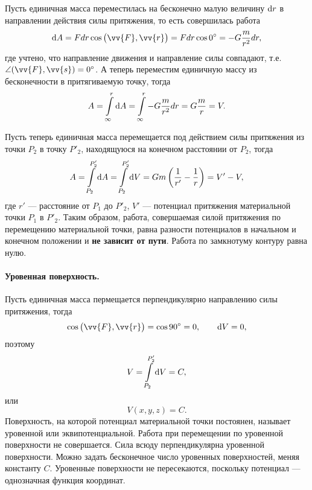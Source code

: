 \documentclass[11pt, a4paper]{article}
\theoremstyle{plain}
\theoremstyle{definition}
\theoremstyle{remark}
\begin{document}
Пусть единичная масса переместилась на бесконечно малую величину $\dif r$ в направлении действия силы
притяжения, то есть совершилась работа
\begin{equation*}
    \dif A = F dr \cos{\left( \vv{F}, \vv{r} \right)} =
    F dr \cos{0^\circ} = -G\dfrac{m}{r^2}dr,
\end{equation*}
где учтено, что направление движения и направление силы совпадают, т.е. $\angle (\vv{F},\vv{s}) =
0^\circ$. А теперь переместим единичную массу из бесконечности в притягиваемую точку, тогда
\begin{equation*}
    A = \int\limits_{\infty}^{r}\dif A = \int\limits_{\infty}^{r} -G\dfrac{m}{r^2}dr =
    G\dfrac{m}{r} = V.
\end{equation*}

Пусть теперь единичная масса перемещается под действием силы притяжения  из точки $P_2$ в точку $P'_2$,
находящуюся на конечном расстоянии от $P_2$, тогда
\begin{equation*}
    A = \int\limits_{P_2}^{P'_2}\dif A =  \int\limits_{P_2}^{P'_2}\dif V = Gm\left( \dfrac{1}{r'} - \dfrac{1}{r}\right) = 
    V' - V,
\end{equation*}
где $r'$ --- расстояние от $P_1$ до $P'_2$, $V'$ --- потенциал притяжения материальной точки $P_1$ в
$P'_2$.
Таким образом, работа, совершаемая силой притяжения по перемещению материальной точки, равна
разности потенциалов в начальном и конечном положении и \textbf{не зависит от пути}. Работа по
замкнотуму контуру равна нулю.

\paragraph{Уровенная поверхность.}
Пусть единичная масса пермещается перпендикулярно направлению силы притяжения, тогда
\begin{equation*}
    \cos{\left( \vv{F}, \vv{r} \right)} = \cos{90^\circ} = 0, \qquad \dif V = 0,
\end{equation*}
поэтому 
\begin{equation*}
    V = \int\limits_{P_2}^{P'_2}\dif V = C, 
\end{equation*}
или
\begin{equation*}
    V \left( x, y, z \right) = C.
\end{equation*}
Поверхность, на которой потенциал материальной точки постоянен, называет уровенной или
эквипотенциальной. Работа при перемещении по уровенной поверхности не совершается.
Сила всюду перпендикулярна уровенной поверхности. Можно задать бесконечное число уровенных
поверхностей, меняя константу $C$. Уровенные поверхности не пересекаются, поскольку потенциал ---
однозначная функция координат.
\end{document}
